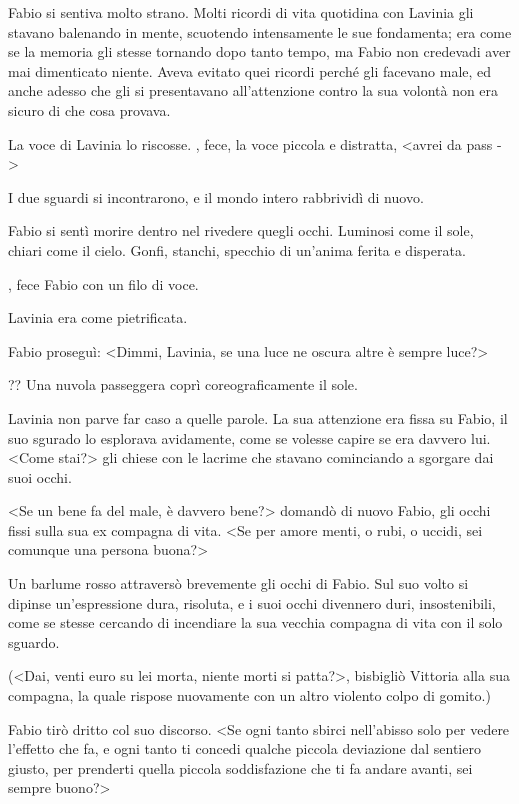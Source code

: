 Fabio si sentiva molto strano. Molti ricordi di vita quotidina con
Lavinia gli stavano balenando in mente, scuotendo intensamente le sue
fondamenta; era come se la memoria gli stesse tornando dopo tanto tempo,
ma Fabio non credevadi aver mai dimenticato niente. Aveva evitato quei
ricordi perché gli facevano male, ed anche adesso che gli si
presentavano all'attenzione contro la sua volontà non era sicuro di che
cosa provava.

La voce di Lavinia lo riscosse. , fece, la voce piccola e distratta,
\textless{}avrei da pass - \textgreater{}

I due sguardi si incontrarono, e il mondo intero rabbrividì di nuovo.

Fabio si sentì morire dentro nel rivedere quegli occhi. Luminosi come il
sole, chiari come il cielo. Gonfi, stanchi, specchio di un'anima ferita
e disperata.

, fece Fabio con un filo di voce.

Lavinia era come pietrificata.

Fabio proseguì: \textless{}Dimmi, Lavinia, se una luce ne oscura altre è
sempre luce?\textgreater{}

?? Una nuvola passeggera coprì coreograficamente il sole.

Lavinia non parve far caso a quelle parole. La sua attenzione era fissa
su Fabio, il suo sgurado lo esplorava avidamente, come se volesse capire
se era davvero lui. \textless{}Come stai?\textgreater{} gli chiese con
le lacrime che stavano cominciando a sgorgare dai suoi occhi.

\textless{}Se un bene fa del male, è davvero bene?\textgreater{} domandò
di nuovo Fabio, gli occhi fissi sulla sua ex compagna di vita.
\textless{}Se per amore menti, o rubi, o uccidi, sei comunque una
persona buona?\textgreater{}

Un barlume rosso attraversò brevemente gli occhi di Fabio. Sul suo volto
si dipinse un'espressione dura, risoluta, e i suoi occhi divennero duri,
insostenibili, come se stesse cercando di incendiare la sua vecchia
compagna di vita con il solo sguardo.

(\textless{}Dai, venti euro su lei morta, niente morti si
patta?\textgreater{}, bisbigliò Vittoria alla sua compagna, la quale
rispose nuovamente con un altro violento colpo di gomito.)

Fabio tirò dritto col suo discorso. \textless{}Se ogni tanto sbirci
nell'abisso solo per vedere l'effetto che fa, e ogni tanto ti concedi
qualche piccola deviazione dal sentiero giusto, per prenderti quella
piccola soddisfazione che ti fa andare avanti, sei sempre
buono?\textgreater{}

